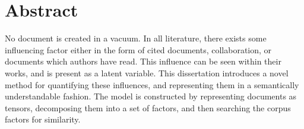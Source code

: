 \chapter*{Abstract}\label{ch:abstract}
No document is created in a vacuum.  In all literature, there exists
some influencing factor either in the form of cited documents,
collaboration, or documents which authors have read.  This influence
can be seen within their works, and is present as a latent variable.
This dissertation introduces a novel method for quantifying these influences,
and representing them in a semantically understandable fashion.  The
model is constructed by representing documents as tensors, decomposing
them into a set of factors, and then searching the corpus factors for
similarity.  
